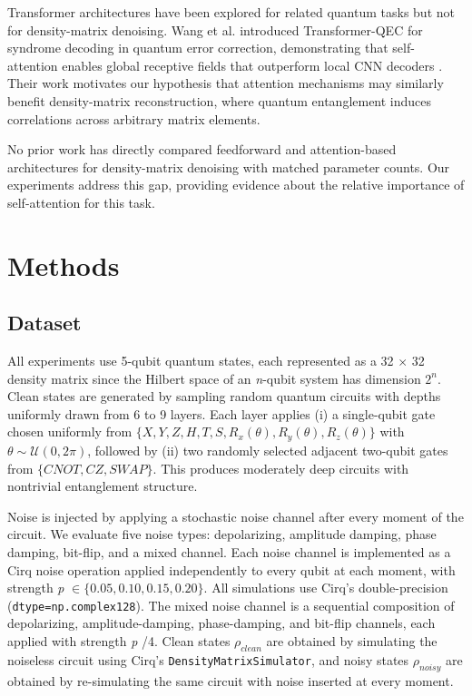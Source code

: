 \documentclass[11pt]{article}
\begin{document}
Transformer architectures have been explored for related quantum tasks but not for density-matrix denoising. Wang et al. introduced Transformer-QEC for syndrome decoding in quantum error correction, demonstrating that self-attention enables global receptive fields that outperform local CNN decoders \citep{wang2023transformerqecquantumerrorcorrection}. Their work motivates our hypothesis that attention mechanisms may similarly benefit density-matrix reconstruction, where quantum entanglement induces correlations across arbitrary matrix elements.

No prior work has directly compared feedforward and attention-based architectures for density-matrix denoising with matched parameter counts. Our experiments address this gap, providing evidence about the relative importance of self-attention for this task.
\section{Methods}
\label{sec:orgfe5e1d2}
\subsection{Dataset}
\label{sec:orgbc10ff0}
All experiments use 5-qubit quantum states, each represented as a 32 \(\times\) 32 density matrix since the Hilbert space of an \emph{n}-qubit system has dimension \(2^n\). Clean states are generated by sampling random quantum circuits with depths uniformly drawn from 6 to 9 layers. Each layer applies (i) a single-qubit gate chosen uniformly from \(\{X, Y, Z, H, T, S, R_x(\theta), R_y(\theta), R_z(\theta)\}\) with \(\theta \sim \mathcal{U}(0, 2\pi)\), followed by (ii) two randomly selected adjacent two-qubit gates from \(\{CNOT, CZ, SWAP\}\). This produces moderately deep circuits with nontrivial entanglement structure.

Noise is injected by applying a stochastic noise channel after every moment of the circuit. We evaluate five noise types: depolarizing, amplitude damping, phase damping, bit-flip, and a mixed channel. Each noise channel is implemented as a Cirq noise operation applied independently to every qubit at each moment, with strength \emph{p} \(\in \{0.05, 0.10, 0.15, 0.20\}\). All simulations use Cirq's double-precision (\texttt{dtype=np.complex128}). The mixed noise channel is a sequential composition of depolarizing, amplitude-damping, phase-damping, and bit-flip channels, each applied with strength \emph{p} /4. Clean states \(\rho_{clean}\) are obtained by simulating the noiseless circuit using Cirq's \texttt{DensityMatrixSimulator}, and noisy states \(\rho_{noisy}\) are obtained by re-simulating the same circuit with noise inserted at every moment.
\end{document}

